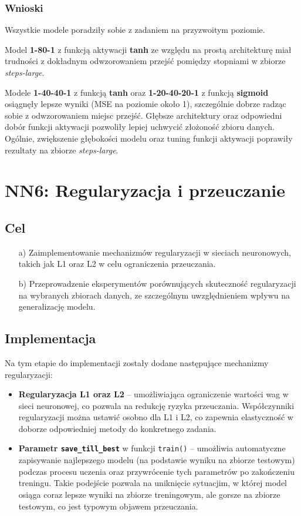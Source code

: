 \documentclass{article}
\begin{document}
\subsubsection*{Wnioski}
Wszystkie modele poradziły sobie z zadaniem na przyzwoitym poziomie.

Model \textbf{1-80-1} z funkcją aktywacji \textbf{tanh} ze względu na prostą architekturę miał trudności z dokładnym odwzorowaniem przejść pomiędzy stopniami w zbiorze \textit{steps-large}.

Modele \textbf{1-40-40-1} z funkcją \textbf{tanh} oraz \textbf{1-20-40-20-1} z funkcją \textbf{sigmoid} osiągnęły lepsze wyniki (MSE na poziomie około 1), szczególnie dobrze radząc sobie z odwzorowaniem miejsc przejść. Głębsze architektury oraz odpowiedni dobór funkcji aktywacji pozwoliły lepiej uchwycić złożoność zbioru danych. Ogólnie, zwiększenie głębokości modelu oraz tuning funkcji aktywacji poprawiły rezultaty na zbiorze \textit{steps-large}.

\section*{NN6: Regularyzacja i przeuczanie}
\subsection*{Cel}
\begin{enumerate}
    \item[a)] Zaimplementowanie mechanizmów regularyzacji w sieciach neuronowych, takich jak L1 oraz L2 w celu ograniczenia przeuczania.
    \item[b)] Przeprowadzenie eksperymentów porównujących skuteczność regularyzacji na wybranych zbiorach danych, ze szczególnym uwzględnieniem wpływu na generalizację modelu.
\end{enumerate}

\subsection*{Implementacja}
Na tym etapie do implementacji zostały dodane następujące mechanizmy regularyzacji:
\begin{itemize}
    \item \textbf{Regularyzacja L1 oraz L2} -- umożliwiająca ograniczenie wartości wag w sieci neuronowej, co pozwala na redukcję ryzyka przeuczania. Współczynniki regularyzacji można ustawić osobno dla L1 i L2, co zapewnia elastyczność w doborze odpowiedniej metody do konkretnego zadania.
    \item \textbf{Parametr \texttt{save\_till\_best}} w funkcji \texttt{train()} -- umożliwia automatyczne zapisywanie najlepszego modelu (na podstawie wyniku na zbiorze testowym) podczas procesu uczenia oraz przywrócenie tych parametrów po zakończeniu treningu. Takie podejście pozwala na uniknięcie sytuacjim, w której model osiąga coraz lepsze wyniki na zbiorze treningowym, ale gorsze na zbiorze testowym, co jest typowym objawem przeuczania.
\end{itemize}
\end{document}
